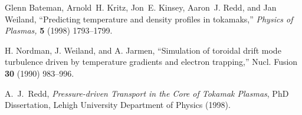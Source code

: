 \begin{thebibliography}{99}

Glenn Bateman, Arnold~H. Kritz, Jon~E. Kinsey, Aaron~J. Redd, and Jan Weiland,
``Predicting temperature and density profiles in tokamaks,''
{\em Physics of Plasmas,} {\bf 5} (1998) 1793--1799.


 H. Nordman, J. Weiland, and A. Jarmen, 
``Simulation of toroidal drift mode turbulence driven by 
temperature gradients and electron trapping,'' 
Nucl. Fusion {\bf 30} (1990) 983--996.



 A.~J.~Redd,
{\it Pressure-driven Transport in the Core of Tokamak Plasmas},
PhD Dissertation, Lehigh University Department of Physics (1998).

\end{thebibliography}

